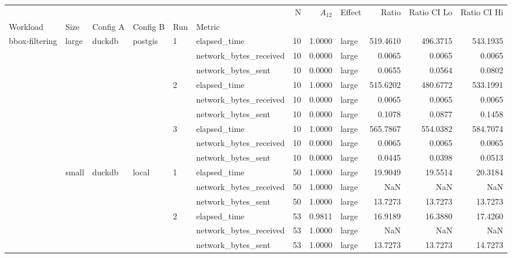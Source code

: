 \begin{tabular}{llllllrrlrrr}
\toprule
 &  &  &  &  &  & N & $A_{12}$ & Effect & Ratio & Ratio CI Lo & Ratio CI Hi \\
Workload & Size & Config A & Config B & Run & Metric &  &  &  &  &  &  \\
\midrule
\multirow[t]{36}{*}{bbox-filtering} & \multirow[t]{9}{*}{large} & \multirow[t]{9}{*}{duckdb} & \multirow[t]{9}{*}{postgis} & \multirow[t]{3}{*}{1} & elapsed_time & 10 & 1.0000 & large & 519.4610 & 496.3715 & 543.1935 \\
 &  &  &  &  & network_bytes_received & 10 & 0.0000 & large & 0.0065 & 0.0065 & 0.0065 \\
 &  &  &  &  & network_bytes_sent & 10 & 0.0000 & large & 0.0655 & 0.0564 & 0.0802 \\
\cline{5-12}
 &  &  &  & \multirow[t]{3}{*}{2} & elapsed_time & 10 & 1.0000 & large & 515.6202 & 480.6772 & 533.1991 \\
 &  &  &  &  & network_bytes_received & 10 & 0.0000 & large & 0.0065 & 0.0065 & 0.0065 \\
 &  &  &  &  & network_bytes_sent & 10 & 0.0000 & large & 0.1078 & 0.0877 & 0.1458 \\
\cline{5-12}
 &  &  &  & \multirow[t]{3}{*}{3} & elapsed_time & 10 & 1.0000 & large & 565.7867 & 554.0382 & 584.7074 \\
 &  &  &  &  & network_bytes_received & 10 & 0.0000 & large & 0.0065 & 0.0065 & 0.0065 \\
 &  &  &  &  & network_bytes_sent & 10 & 0.0000 & large & 0.0445 & 0.0398 & 0.0513 \\
\cline{2-12} \cline{3-12} \cline{4-12} \cline{5-12}
 & \multirow[t]{27}{*}{small} & \multirow[t]{18}{*}{duckdb} & \multirow[t]{9}{*}{local} & \multirow[t]{3}{*}{1} & elapsed_time & 50 & 1.0000 & large & 19.9049 & 19.5514 & 20.3184 \\
 &  &  &  &  & network_bytes_received & 50 & 1.0000 & large & NaN & NaN & NaN \\
 &  &  &  &  & network_bytes_sent & 50 & 1.0000 & large & 13.7273 & 13.7273 & 13.7273 \\
\cline{5-12}
 &  &  &  & \multirow[t]{3}{*}{2} & elapsed_time & 53 & 0.9811 & large & 16.9189 & 16.3880 & 17.4260 \\
 &  &  &  &  & network_bytes_received & 53 & 1.0000 & large & NaN & NaN & NaN \\
 &  &  &  &  & network_bytes_sent & 53 & 1.0000 & large & 13.7273 & 13.7273 & 14.7273 \\

\end{tabular}
